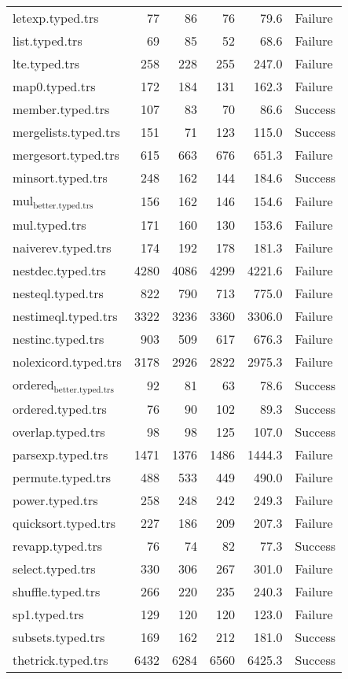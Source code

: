 \documentclass[11pt]{article}
\begin{document}
\begin{center}
\begin{tabular}{lrrrrl}
letexp.typed.trs & 77 & 86 & 76 & 79.6 & Failure\\
list.typed.trs & 69 & 85 & 52 & 68.6 & Failure\\
lte.typed.trs & 258 & 228 & 255 & 247.0 & Failure\\
map0.typed.trs & 172 & 184 & 131 & 162.3 & Failure\\
member.typed.trs & 107 & 83 & 70 & 86.6 & Success\\
mergelists.typed.trs & 151 & 71 & 123 & 115.0 & Success\\
mergesort.typed.trs & 615 & 663 & 676 & 651.3 & Failure\\
minsort.typed.trs & 248 & 162 & 144 & 184.6 & Success\\
mul\(_{\text{better.typed.trs}}\) & 156 & 162 & 146 & 154.6 & Failure\\
mul.typed.trs & 171 & 160 & 130 & 153.6 & Failure\\
naiverev.typed.trs & 174 & 192 & 178 & 181.3 & Failure\\
nestdec.typed.trs & 4280 & 4086 & 4299 & 4221.6 & Failure\\
nesteql.typed.trs & 822 & 790 & 713 & 775.0 & Failure\\
nestimeql.typed.trs & 3322 & 3236 & 3360 & 3306.0 & Failure\\
nestinc.typed.trs & 903 & 509 & 617 & 676.3 & Failure\\
nolexicord.typed.trs & 3178 & 2926 & 2822 & 2975.3 & Failure\\
ordered\(_{\text{better.typed.trs}}\) & 92 & 81 & 63 & 78.6 & Success\\
ordered.typed.trs & 76 & 90 & 102 & 89.3 & Success\\
overlap.typed.trs & 98 & 98 & 125 & 107.0 & Success\\
parsexp.typed.trs & 1471 & 1376 & 1486 & 1444.3 & Failure\\
permute.typed.trs & 488 & 533 & 449 & 490.0 & Failure\\
power.typed.trs & 258 & 248 & 242 & 249.3 & Failure\\
quicksort.typed.trs & 227 & 186 & 209 & 207.3 & Failure\\
revapp.typed.trs & 76 & 74 & 82 & 77.3 & Success\\
select.typed.trs & 330 & 306 & 267 & 301.0 & Failure\\
shuffle.typed.trs & 266 & 220 & 235 & 240.3 & Failure\\
sp1.typed.trs & 129 & 120 & 120 & 123.0 & Failure\\
subsets.typed.trs & 169 & 162 & 212 & 181.0 & Success\\
thetrick.typed.trs & 6432 & 6284 & 6560 & 6425.3 & Success\\
\end{tabular}

\end{center}
\end{document}
